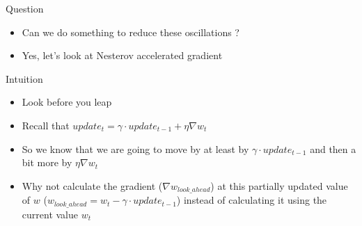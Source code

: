 \begin{frame}
\end{frame}

\begin{frame}
	\begin{overlayarea}{\textwidth}{\textheight}
		\begin{block}{Question}
			\begin{itemize}\justifying
				\item Can we do something  to reduce these oscillations ?
				      \item<2-> Yes, let's look at Nesterov accelerated gradient
			\end{itemize}
		\end{block}
	\end{overlayarea}
\end{frame}

\begin{frame}
	
	\begin{overlayarea}{\textwidth}{\textheight}
		\vspace{-0.2in}
		\begin{block}{Intuition}
			\begin{itemize}\justifying
				\item<1-> Look before you leap
				\item<2-> Recall that $update_{t} = \gamma\cdot update_{t-1} + \eta \nabla w_{t}$
				\item<3-> So we know that we are going to move by at least by $\gamma\cdot update_{t-1}$ and then a bit more by $\eta \nabla w_{t}$
				\item<4-> Why not calculate the gradient ($\nabla w_{look\_ahead}$) at this partially updated value of $w$ ($w_{look\_ahead} = w_{t} - \gamma\cdot update_{t-1}$)  instead of calculating it using the current value $w_{t}$
			\end{itemize}
		\end{block}
		
	\end{overlayarea}
\end{frame}

